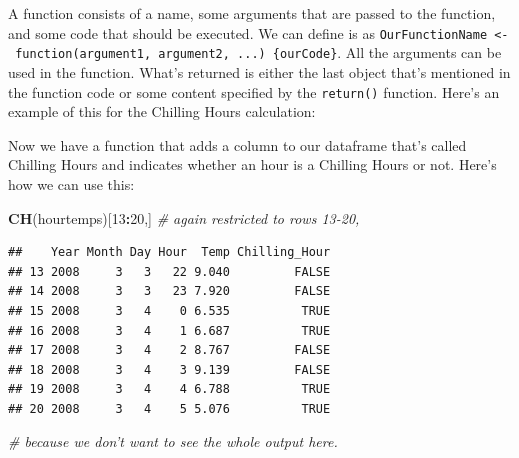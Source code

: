 \documentclass[
]{book}
\newenvironment{Shaded}{\begin{snugshade}}{\end{snugshade}}
\newcommand{\CommentTok}[1]{\textcolor[rgb]{0.56,0.35,0.01}{\textit{#1}}}
\newcommand{\ControlFlowTok}[1]{\textcolor[rgb]{0.13,0.29,0.53}{\textbf{#1}}}
\newcommand{\DecValTok}[1]{\textcolor[rgb]{0.00,0.00,0.81}{#1}}
\newcommand{\FloatTok}[1]{\textcolor[rgb]{0.00,0.00,0.81}{#1}}
\newcommand{\KeywordTok}[1]{\textcolor[rgb]{0.13,0.29,0.53}{\textbf{#1}}}
\newcommand{\NormalTok}[1]{#1}
\newcommand{\OperatorTok}[1]{\textcolor[rgb]{0.81,0.36,0.00}{\textbf{#1}}}
\newcommand{\StringTok}[1]{\textcolor[rgb]{0.31,0.60,0.02}{#1}}
\begin{document}
A function consists of a name, some arguments that are passed to the function, and some code that should be executed. We can define is as \texttt{OurFunctionName\ \textless{}-\ function(argument1,\ argument2,\ ...)\ \{ourCode\}}. All the arguments can be used in the function. What's returned is either the last object that's mentioned in the function code or some content specified by the \texttt{return()} function. Here's an example of this for the Chilling Hours calculation:

\begin{Shaded}
\end{Shaded}

Now we have a function that adds a column to our dataframe that's called Chilling Hours and indicates whether an hour is a Chilling Hours or not. Here's how we can use this:

\begin{Shaded}
\begin{Highlighting}[]
\KeywordTok{CH}\NormalTok{(hourtemps)[}\DecValTok{13}\OperatorTok{:}\DecValTok{20}\NormalTok{,]  }\CommentTok{# again restricted to rows 13-20,}
\end{Highlighting}
\end{Shaded}

\begin{verbatim}
##    Year Month Day Hour  Temp Chilling_Hour
## 13 2008     3   3   22 9.040         FALSE
## 14 2008     3   3   23 7.920         FALSE
## 15 2008     3   4    0 6.535          TRUE
## 16 2008     3   4    1 6.687          TRUE
## 17 2008     3   4    2 8.767         FALSE
## 18 2008     3   4    3 9.139         FALSE
## 19 2008     3   4    4 6.788          TRUE
## 20 2008     3   4    5 5.076          TRUE
\end{verbatim}

\begin{Shaded}
\begin{Highlighting}[]
                       \CommentTok{# because we don't want to see the whole output here.}
\end{Highlighting}
\end{Shaded}
\end{document}
